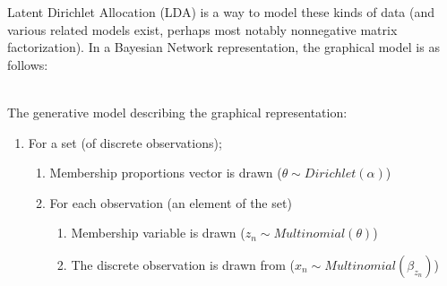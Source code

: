 \documentclass{article}%
\begin{document}
Latent Dirichlet Allocation (LDA) is a way to model these kinds of data (and various related models exist, perhaps most notably nonnegative matrix factorization). In a Bayesian Network representation, the graphical model is as follows:
\begin{figure}[h]
	\end{figure}
\\The generative model describing the graphical representation:
	\begin{enumerate}
		\item For a set (of discrete observations);
		\begin{enumerate}
			\item Membership proportions vector is drawn ($\theta \sim Dirichlet(\alpha)$)
			\item For each observation (an element of the set)
			\begin{enumerate}
				\item Membership variable is drawn ($z_n \sim Multinomial(\theta)$)
				\item The discrete observation is drawn from ($x_n \sim Multinomial(\beta_{z_n})$)
			\end{enumerate}
		\end{enumerate}
	\end{enumerate}
	
\end{document}
